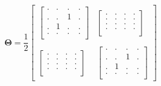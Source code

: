 \documentclass{article}
\begin{document}
\[
    \mathbf{\Theta} = 
    \frac{1}{2}
    \begin{bmatrix}
        \begin{bmatrix}
            . & . & . & . \\
            . & . & 1 & . \\
            . & 1 & . & . \\
            . & . & . & . \\
        \end{bmatrix} &
        \begin{bmatrix}
            . & . & . & . \\
            . & . & . & . \\
            . & . & . & . \\
            . & . & . & . \\
        \end{bmatrix} \\ \\
        \begin{bmatrix}
            . & . & . & . \\
            . & . & . & . \\
            . & . & . & . \\
            . & . & . & . \\
        \end{bmatrix} &
        \begin{bmatrix}
            . & . & . & . \\
            . & . & 1 & . \\
            . & 1 & . & . \\
            . & . & . & . \\
        \end{bmatrix}
    \end{bmatrix}
\]
\end{document}
